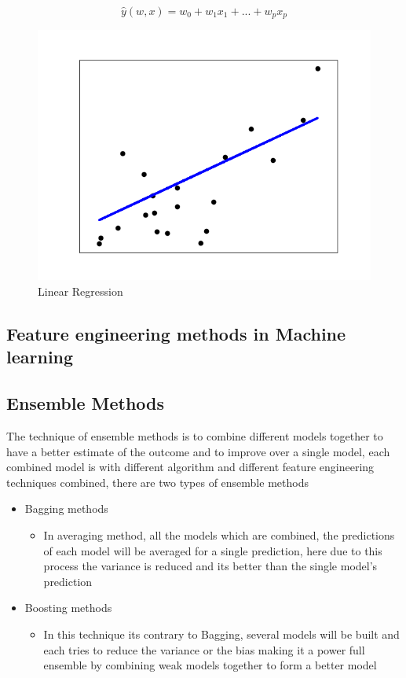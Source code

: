 \begin{itemize}
\begin{itemize}
    \begin{equation}
        \hat{y}(w, x) = w_0 + w_1 x_1 + ... + w_p x_p
        \label{eqn:linreg}
    \end{equation}
    
    \begin{figure}[!h]
        	\centering
        	\includegraphics[width=0.6\linewidth]{thesis_template/images/linreg.png}
        	\caption{Linear Regression}
        	\label{fig:linreg}
            \end{figure}
            
\end{itemize}
\end{itemize}

\subsection{Feature engineering methods in Machine learning}

\subsection{Ensemble Methods}
The technique of ensemble methods is to combine different models together to have a better estimate of the outcome and to improve over a single model, each combined model is with different algorithm and different feature engineering techniques combined, there are two types of ensemble methods
\begin{itemize}
    \item Bagging methods 
    \begin{itemize}
        \item In averaging method, all the models which are combined, the predictions of each model will be averaged for a single prediction, here due to this process the variance is reduced and its better than the single model's prediction
    \end{itemize}
    
    \item Boosting methods
    \begin{itemize}
        \item In this technique its contrary to Bagging, several models will be built and each  tries to reduce the variance or the bias making it a power full ensemble by combining weak models together to form a better model
    \end{itemize}
\end{itemize}

